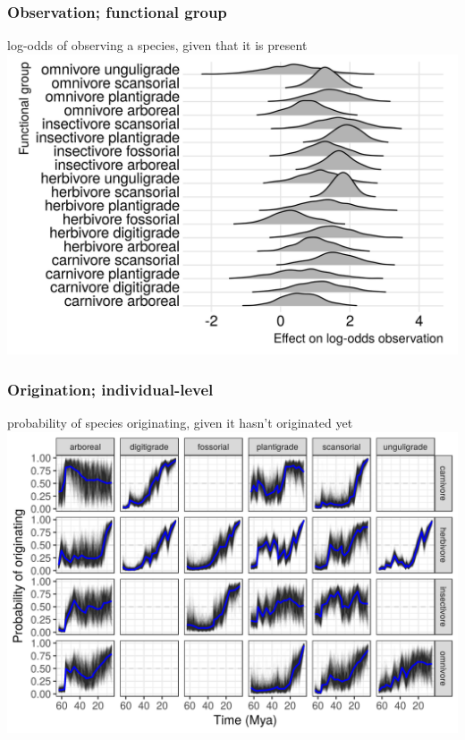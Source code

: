 \documentclass{beamer}
\begin{document}
\begin{frame}
  \frametitle{Observation; functional group}
  \begin{center}
    log-odds of observing a species, given that it is present
    \includegraphics[height=0.8\textheight,width=\textwidth,keepaspectratio=true]{figure/ecotype_observation}
  \end{center}
\end{frame}

\begin{frame}
  \frametitle{Origination; individual-level}
  \begin{center}
    probability of species originating, given it hasn't originated yet
    \includegraphics[height=0.8\textheight,width=\textwidth,keepaspectratio=true]{figure/ecotype_origin_bd}
  \end{center}
\end{frame}
\end{document}
